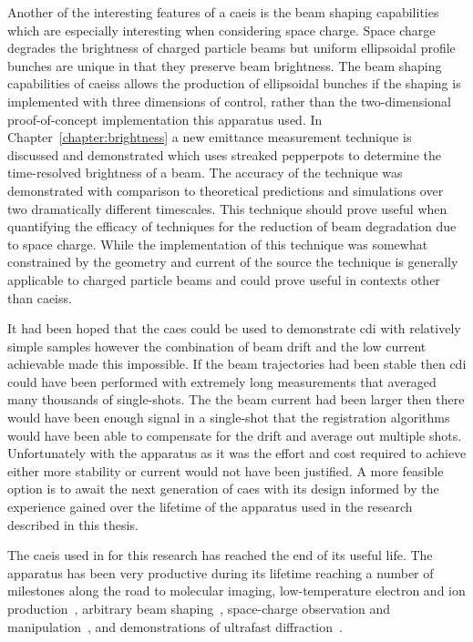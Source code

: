Another of the interesting features of a \gls{caeis} is the beam shaping capabilities which are especially interesting when considering space charge.
Space charge degrades the brightness of charged particle beams but uniform ellipsoidal profile bunches are unique in that they preserve beam brightness.
The beam shaping capabilities of \glspl{caeis} allows the production of ellipsoidal bunches if the shaping is implemented with three dimensions of control, rather than the two-dimensional proof-of-concept implementation this apparatus used.
In Chapter~\ref{chapter:brightness} a new emittance measurement technique is discussed and demonstrated which uses streaked pepperpots to determine the time-resolved brightness of a beam.
The accuracy of the technique was demonstrated with comparison to theoretical predictions and simulations over two dramatically different timescales.
This technique should prove useful when quantifying the efficacy of techniques for the reduction of beam degradation due to space charge.
While the implementation of this technique was somewhat constrained by the geometry and current of the source the technique is generally applicable to charged particle beams and could prove useful in contexts other than \glspl{caeis}.

It had been hoped that the \gls{caes} could be used to demonstrate \gls{cdi} with relatively simple samples however the combination of beam drift and the low current achievable made this impossible.
If the beam trajectories had been stable then \gls{cdi} could have been performed with extremely long measurements that averaged many thousands of single-shots.
The the beam current had been larger then there would have been enough signal in a single-shot that the registration algorithms would have been able to compensate for the drift and average out multiple shots.
Unfortunately with the apparatus as it was the effort and cost required to achieve either more stability or current would not have been justified.
A more feasible option is to await the next generation of \gls{caes} with its design informed by the experience gained over the lifetime of the apparatus used in the research described in this thesis.

The \gls{caeis} used in for this research has reached the end of its useful life.
The apparatus has been very productive during its lifetime reaching a number of milestones along the road to molecular imaging, low-temperature electron and ion production~\cite{saliba_spatial_2012,mcculloch_high-coherence_2013,mcculloch_field_2017,speirs_identification_2017}, arbitrary beam shaping~\cite{mcculloch_arbitrarily_2011}, space-charge observation and manipulation~\cite{murphy_detailed_2014,murphy_increasing_2015,thompson_suppression_2016}, and demonstrations of ultrafast diffraction~\cite{speirs_single-shot_2015}.

